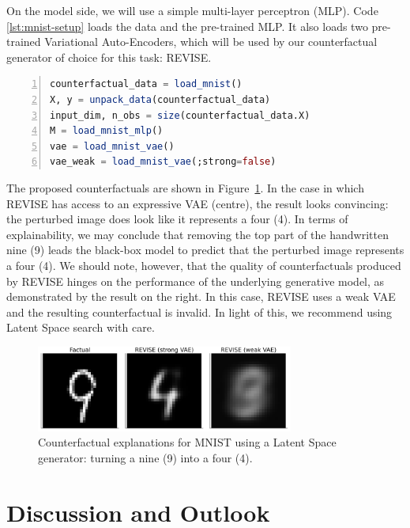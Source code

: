 \documentclass[
  letterpaper,
  DIV=11,
  numbers=noendperiod]{scrartcl}
\begin{document}
On the model side, we will use a simple multi-layer perceptron (MLP).
Code \ref{lst:mnist-setup} loads the data and the pre-trained MLP. It
also loads two pre-trained Variational Auto-Encoders, which will be used
by our counterfactual generator of choice for this task: REVISE.

\begin{lstlisting}[language=Julia, escapechar=@, numbers=left, label={lst:mnist-setup}, caption={Loading pre-trained models and data for MNIST.}]
counterfactual_data = load_mnist()
X, y = unpack_data(counterfactual_data)
input_dim, n_obs = size(counterfactual_data.X)
M = load_mnist_mlp()
vae = load_mnist_vae()
vae_weak = load_mnist_vae(;strong=false)
\end{lstlisting}

The proposed counterfactuals are shown in Figure~\ref{fig-mnist}. In the
case in which REVISE has access to an expressive VAE (centre), the
result looks convincing: the perturbed image does look like it
represents a four (4). In terms of explainability, we may conclude that
removing the top part of the handwritten nine (9) leads the black-box
model to predict that the perturbed image represents a four (4). We
should note, however, that the quality of counterfactuals produced by
REVISE hinges on the performance of the underlying generative model, as
demonstrated by the result on the right. In this case, REVISE uses a
weak VAE and the resulting counterfactual is invalid. In light of this,
we recommend using Latent Space search with care.

\begin{figure}

{\centering \includegraphics[width=3.33333in,height=1.11111in]{www/mnist_9to4_latent.png}

}

\caption{\label{fig-mnist}Counterfactual explanations for MNIST using a
Latent Space generator: turning a nine (9) into a four (4).}

\end{figure}

\hypertarget{sec-outlook}{%
\section{Discussion and Outlook}\label{sec-outlook}}
\end{document}
